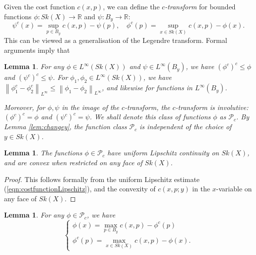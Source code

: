 \documentclass[a4paper]{article}
\newtheorem{lem}[thm]{Lemma}
\theoremstyle{definition}
\newcommand{\R}{\mathbb{R}}
\newcommand{\norm}[1]{\left\lVert#1\right\rVert}
\begin{document}
	Given the cost function $c(x,p)$, we can define the \emph{$c$-transform} for bounded functions $\phi: Sk(X)\to \R$ and $\psi: B_y\to \R$:
	\begin{equation}\label{eqn:ctransform}
		\psi^c(x)= \sup_{p\in B_y}c(x,p) - \psi(p),\quad
		\phi^c(p)= \sup_{x\in Sk(X)} c(x,p) -\phi(x).
	\end{equation}
	This can be viewed as a generalisation of the Legendre transform. Formal arguments imply that
	
	
	
	\begin{lem}\label{lem:Pc}
		For any $\phi\in L^\infty(Sk(X))$ and $\psi\in L^\infty(B_y)$, we have $(\phi^c)^c\leq \phi$ and $(\psi^c)^c \leq \psi$. For $\phi_1,\phi_2\in L^\infty(Sk(X))$, we have $\norm{\phi_1^c-\phi_2^c}_{L^\infty}\leq \norm{\phi_1-\phi_2}_{L^\infty}$, and likewise for functions in $L^\infty(B_y)$.
		
		
		
		Moreover, for $\phi, \psi$ in the image of the $c$-transform, the $c$-transform is involutive: $(\phi^c)^c=\phi$ and $(\psi^c)^c=\psi$. We shall denote this class of functions $\phi$ as $\mathcal{P}_c$. By Lemma \ref{lem:changey}, the function class $\mathcal{P}_c$ is independent of the choice of $y\in Sk(X)$.
	\end{lem}
	
	
	
	
	
	
	\begin{lem}\label{lem:uniformcontinuityPc}
		The functions $\phi\in \mathcal{P}_c$ have uniform Lipschitz continuity on $Sk(X)$, and are convex when restricted on any face of $Sk(X)$.
	\end{lem}
	
	
	\begin{proof}
		This follows formally from the uniform Lipschitz estimate (\ref{eqn:costfunctionLipschitz}), and the convexity of $c(x,p;y)$ in the $x$-variable on any face of $Sk(X)$.
	\end{proof}
	
	
	
	
	\begin{lem}\label{lem:ctransformmax}
	For any $\phi\in \mathcal{P}_c$, we have 
	\[
	\begin{cases}
	\phi(x)= \max_{p\in B_y} c(x,p)- \phi^c(p)
	\\
	\phi^c(p)= \max_{x\in Sk(X)} c(x,p)- \phi(x).
	\end{cases}
	\]
	
	

	\end{lem}
	
\end{document}
